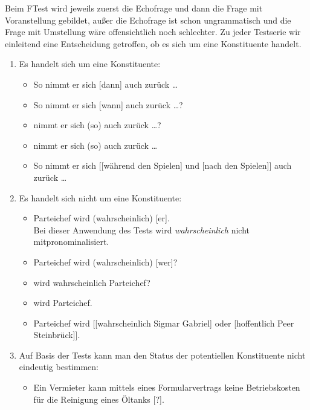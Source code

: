 

Beim FTest wird jeweils zuerst die Echofrage und dann die Frage mit Voranstellung gebildet, außer die Echofrage ist schon ungrammatisch und die Frage mit Umstellung wäre offensichtlich noch schlechter.
Zu jeder Testserie wir einleitend eine Entscheidung getroffen, ob es sich um eine Konstituente handelt.

\begin{enumerate}\Lf
  \item Es handelt sich um eine Konstituente:
    \begin{itemize}\Lf
      \item \ProTest So nimmt er sich [dann] auch zurück \ldots
      \item \FTest So nimmt er sich [wann] auch zurück \ldots ?
      \item \FTest [Wann] nimmt er sich (so) auch zurück \ldots ?
      \item {} nimmt er sich (so) auch zurück \ldots
      \item \KoorTest So nimmt er sich [[während den Spielen] und [nach den Spielen]] auch zurück \ldots
    \end{itemize}
  \item Es handelt sich nicht um eine Konstituente:
    \begin{itemize}\Lf
      \item \ProTest \Ast Parteichef wird (wahrscheinlich) [er].\\
        Bei dieser Anwendung des Tests wird \textit{wahrscheinlich} nicht mitpronominalisiert.
      \item \FTest \Ast Parteichef wird (wahrscheinlich) [wer]?
      \item \FTest \Ast [Wer] wird wahrscheinlich Parteichef?
      \item \VfTest {} wird Parteichef.
      \item \KoorTest Parteichef wird [[wahrscheinlich Sigmar Gabriel] oder [hoffentlich Peer Steinbrück]].
    \end{itemize}
  \item Auf Basis der Tests kann man den Status der potentiellen Konstituente nicht eindeutig bestimmen:
    \begin{itemize}\Lf
      \item \ProTest \Ast Ein Vermieter kann mittels eines Formularvertrags keine Betriebskosten für die Reinigung eines Öltanks [?].

\end{itemize}
\end{enumerate}
